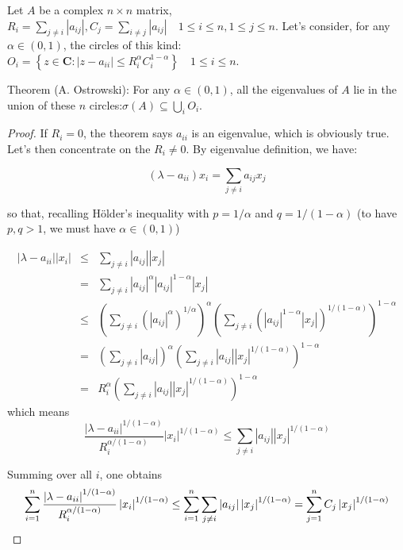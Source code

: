 \documentclass[12pt]{article}
\begin{document}
Let $A$ be a complex $n\times n$ matrix, $R_i=\sum_{j\ne i}\left|a_{ij}\right|, C_j=\sum_{i\ne j}\left|a_{ij}\right|\quad 1\leq i\leq n, 1\leq j\leq n$. Let's consider, for any $\alpha\in (0,1)$, the circles of this kind: $O_i=\left\{z\in\mathbf{C}:\left|z-a_{ii}\right|\leq R_i^\alpha C_i^{1-\alpha}\right\}\quad 1\leq i\leq n$.

Theorem (A. Ostrowski): For any $\alpha\in (0,1)$, all the eigenvalues of $A$ lie in the union of these $n$ circles:$\sigma(A)\subseteq\bigcup_{i}O_i$.

\begin{proof}
If $R_i=0$, the theorem says $a_{ii}$ is an eigenvalue, which
is obviously true. Let's then concentrate on the $R_i\neq 0$. By eigenvalue definition, we have:

\[
(\lambda -a_{ii})x_{i}=\sum_{j\neq i}a_{ij}x_{j} 
\]

so that, recalling H\"older's inequality with $p=1/\alpha $ and $q=1/(1-\alpha
)$ (to have $p,q>1$, we must have $\alpha \in (0,1)$)

\begin{eqnarray*}
\left\vert \lambda -a_{ii}\right\vert \left\vert x_{i}\right\vert &\leq
&\sum_{j\neq i}\left\vert a_{ij}\right\vert \left\vert x_{j}\right\vert \\
&=&\sum_{j\neq i}\left\vert a_{ij}\right\vert ^{\alpha }\left\vert
a_{ij}\right\vert ^{1-\alpha }\left\vert x_{j}\right\vert \\
&\leq &\left( \sum_{j\neq i}(\left\vert a_{ij}\right\vert ^{\alpha
})^{1/\alpha }\right) ^{\alpha }\left( \sum_{j\neq i}(\left\vert
a_{ij}\right\vert ^{1-\alpha }\left\vert x_{j}\right\vert )^{1/(1-\alpha
)}\right) ^{1-\alpha } \\
&=&\left( \sum_{j\neq i}\left\vert a_{ij}\right\vert \right) ^{\alpha
}\left( \sum_{j\neq i}\left\vert a_{ij}\right\vert \left\vert
x_{j}\right\vert ^{1/(1-\alpha )}\right) ^{1-\alpha } \\
 &=&R_{i}^{\alpha }\left(
\sum_{j\neq i}\left\vert a_{ij}\right\vert \left\vert x_{j}\right\vert
^{1/(1-\alpha )}\right) ^{1-\alpha }
\end{eqnarray*}
which means%
\[
\frac{\left\vert \lambda -a_{ii}\right\vert ^{1/(1-\alpha )}}{R_{i}^{\alpha
/(1-\alpha )}}\left\vert x_{i}\right\vert ^{1/(1-\alpha )}\leq \sum_{j\neq
i}\left\vert a_{ij}\right\vert \left\vert x_{j}\right\vert ^{1/(1-\alpha )} 
\]

Summing over all $i$, one obtains
\[
\sum_{i=1}^{n}\frac{\left\vert \lambda -a_{ii}\right\vert ^{1/(1-\alpha )}}{%
R_{i}^{\alpha /(1-\alpha )}}\left\vert x_{i}\right\vert ^{1/(1-\alpha )}\leq
\sum_{i=1}^{n}\sum_{j\neq i}\left\vert a_{ij}\right\vert \left\vert x_{j}\right\vert ^{1/(1-\alpha)}=\sum_{j=1}^{n}C_{j}\left\vert x_{j}\right\vert ^{1/(1-\alpha )} 
\]


\end{proof}
\end{document}
